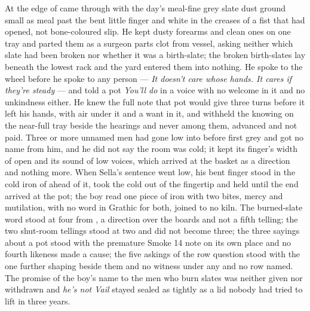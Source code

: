 At the edge of   came through with the day's meal-fine grey slate dust ground small as meal past the bent little finger and white in the creases of a fist that had opened, not bone-coloured slip. He kept dusty forearms and clean ones on one tray and parted them as a surgeon parts clot from vessel, asking neither which slate had been broken nor whether it was a birth-slate; the broken birth-slates lay beneath the lowest rack and the yard entered them into nothing. He spoke to the wheel before he spoke to any person --- \emph{It doesn't care whose hands. It cares if they're steady} --- and told a pot \emph{You'll do} in a voice with no welcome in it and no unkindness either. He knew the full note that pot would give three turns before it left his hands, with air under it and a want in it, and withheld the knowing on the near-full tray beside the hearings and never among them, advanced and not paid. Three or more unnamed men had gone low into  before first grey and got no name from him, and he did not say the room was cold; it kept its finger's width of open and its sound of low voices, which arrived at the basket as a direction and nothing more. When Sella's sentence went low, his bent finger stood in the cold iron of  ahead of it, took the cold out of the fingertip and held until the end arrived at the pot; the boy read one piece of iron with two bites, mercy and mutilation, with no word in Grathic for both, joined to no kiln. The burned-slate word stood at four from , a direction over the boards and not a fifth telling; the two shut-room tellings stood at two and did not become three; the three sayings about a pot stood with the premature Smoke 14 note on its own place and no fourth likeness made a cause; the five askings of the row question stood with the one further shaping beside them and no witness under any and no row named. The promise of the boy's name to the men who burn slates was neither given nor withdrawn and \emph{he's not Vail} stayed sealed as tightly as a lid nobody had tried to lift in three years.

\scenebreak

